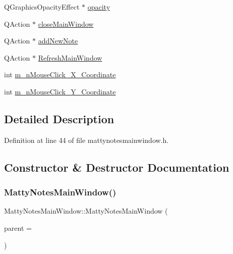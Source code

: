\begin{DoxyCompactItemize}
\item 
Q\+Graphics\+Opacity\+Effect $\ast$ \hyperlink{classMattyNotesMainWindow_af8ed120785fb64d9df0c6682fcdb4977}{opacity}
\item 
Q\+Action $\ast$ \hyperlink{classMattyNotesMainWindow_a32fe79cffd4624ce7579cabc6f433932}{close\+Main\+Window}
\item 
Q\+Action $\ast$ \hyperlink{classMattyNotesMainWindow_abae8d206a434f0aceb166e2989afbcbc}{add\+New\+Note}
\item 
Q\+Action $\ast$ \hyperlink{classMattyNotesMainWindow_a5a9a3eb38d87523446ea1d765e78048d}{Refresh\+Main\+Window}
\item 
int \hyperlink{classMattyNotesMainWindow_a40aea49d6193169d442deffef9eaf580}{m\+\_\+n\+Mouse\+Click\+\_\+\+X\+\_\+\+Coordinate}
\item 
int \hyperlink{classMattyNotesMainWindow_ac629bfbb61eee078fb9f4a7dfba5c22e}{m\+\_\+n\+Mouse\+Click\+\_\+\+Y\+\_\+\+Coordinate}
\end{DoxyCompactItemize}


\subsection{Detailed Description}


Definition at line 44 of file mattynotesmainwindow.\+h.



\subsection{Constructor \& Destructor Documentation}
\hypertarget{classMattyNotesMainWindow_aa788ae37a712be6e1ea281c349342908}{}\label{classMattyNotesMainWindow_aa788ae37a712be6e1ea281c349342908} 
\subsubsection{\texorpdfstring{Matty\+Notes\+Main\+Window()}{MattyNotesMainWindow()}}
{\footnotesize\ttfamily Matty\+Notes\+Main\+Window\+::\+Matty\+Notes\+Main\+Window (\begin{DoxyParamCaption}\item[{Q\+Widget $\ast$}]{parent = {} }\end{DoxyParamCaption})}




